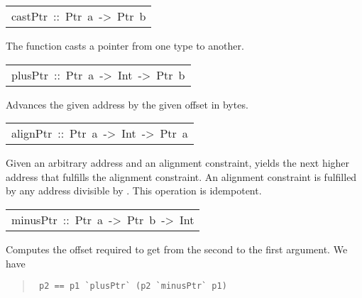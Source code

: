 \begin{haddockdesc}
\item[\begin{tabular}{@{}l}
castPtr\ ::\ Ptr\ a\ ->\ Ptr\ b
\end{tabular}]\haddockbegindoc
The  function casts a pointer from one type to another.
\par

\end{haddockdesc}
\begin{haddockdesc}
\item[\begin{tabular}{@{}l}
plusPtr\ ::\ Ptr\ a\ ->\ Int\ ->\ Ptr\ b
\end{tabular}]\haddockbegindoc
Advances the given address by the given offset in bytes.
\par

\end{haddockdesc}
\begin{haddockdesc}
\item[\begin{tabular}{@{}l}
alignPtr\ ::\ Ptr\ a\ ->\ Int\ ->\ Ptr\ a
\end{tabular}]\haddockbegindoc
Given an arbitrary address and an alignment constraint,
  yields the next higher address that fulfills the
 alignment constraint.  An alignment constraint  is fulfilled by
 any address divisible by .  This operation is idempotent.
\par

\end{haddockdesc}
\begin{haddockdesc}
\item[\begin{tabular}{@{}l}
minusPtr\ ::\ Ptr\ a\ ->\ Ptr\ b\ ->\ Int
\end{tabular}]\haddockbegindoc
Computes the offset required to get from the second to the first
 argument.  We have 
\par
\begin{quote}
{\haddockverb\begin{verbatim}
 p2 == p1 `plusPtr` (p2 `minusPtr` p1)
\end{verbatim}}
\end{quote}

\end{haddockdesc}

